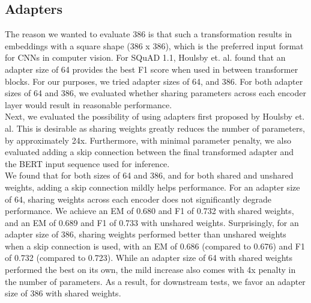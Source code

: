 \subsection{Adapters}
The reason we wanted to evaluate 386 is that such a transformation results in embeddings with a square shape (386 x 386), which is the preferred input format for CNNs in computer vision. For SQuAD 1.1, Houlsby et. al. found that an adapter size of 64 provides the best F1 score when used in between transformer blocks. For our purposes, we tried adapter sizes of 64, and 386. For both adapter sizes of 64 and 386, we evaluated whether sharing parameters across each encoder layer would result in reasonable performance.  \\
Next, we evaluated the possibility of using adapters first proposed by Houlsby et. al. This is desirable as sharing weights greatly reduces the number of parameters, by approximately 24x. Furthermore, with minimal parameter penalty, we also evaluated adding a skip connection between the final transformed adapter and the BERT input sequence used for inference. \\

We found that for both sizes of 64 and 386, and for both shared and unshared weights, adding a skip connection mildly helps performance. For an adapter size of 64, sharing weights across each encoder does not significantly degrade performance. We achieve an EM of 0.680 and F1 of 0.732 with shared weights, and an EM of 0.689 and F1 of 0.733 with unshared weights. Surprisingly, for an adapter size of 386, sharing weights performed better than unshared weights when a skip connection is used, with an EM of 0.686 (compared to 0.676) and F1 of 0.732 (compared to 0.723). While an adapter size of 64 with shared weights performed the best on its own, the mild increase also comes with 4x penalty in the number of parameters. As a result, for downstream tests, we favor an adapter size of 386 with shared weights. 
